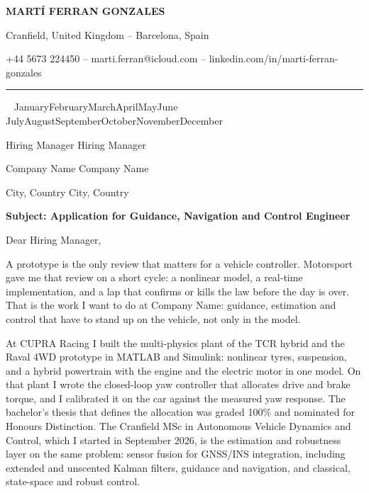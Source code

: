 \documentclass[a4paper,11pt]{article}
\newcommand{\letterdate}{%
  \number\day\ \ifcase\month\or
  January\or February\or March\or April\or May\or June\or
  July\or August\or September\or October\or November\or December\fi
  \ \number\year}
\newcommand{\recipientname}{Hiring Manager}
\newcommand{\recipientrole}{Talent Acquisition}
\newcommand{\company}{Company Name}
\newcommand{\companycity}{City, Country}
\newcommand{\rolename}{Guidance, Navigation and Control Engineer}
\newcommand{\letterline}[1]{%
  \edef\letterlinetmp{#1}%
  \ifx\letterlinetmp\empty\else
    \letterlinetmp\par
  \fi
}
\begin{document}
{\centering
\textbf{\Huge MARTÍ FERRAN GONZALES}\par
\vspace{1pt}
{\fontsize{10}{12}\selectfont
Cranfield, United Kingdom -- Barcelona, Spain\par
\vspace{1pt}
+44 5673 224450 -- marti.ferran@icloud.com -- linkedin.com/in/marti-ferran-gonzales\par
}
\vspace{4pt}
}
\nointerlineskip
\rule{\textwidth}{0.4pt}\par
\vspace{10pt}
\nointerlineskip

\letterdate\par
\vspace{18pt}
\nointerlineskip
\letterline{\recipientname}
\letterline{\company}
\letterline{\companycity}
\vspace{10pt}
\nointerlineskip
\textbf{Subject: Application for \rolename}\par
\vspace{10pt}
\nointerlineskip
Dear \recipientname,\par
\setlength{\parskip}{8pt}

A prototype is the only review that matters for a vehicle controller. Motorsport gave me that review on a short cycle: a nonlinear model, a real-time implementation, and a lap that confirms or kills the law before the day is over. That is the work I want to do at \company: guidance, estimation and control that have to stand up on the vehicle, not only in the model.

At CUPRA Racing I built the multi-physics plant of the TCR hybrid and the Raval 4WD prototype in MATLAB and Simulink: nonlinear tyres, suspension, and a hybrid powertrain with the engine and the electric motor in one model. On that plant I wrote the closed-loop yaw controller that allocates drive and brake torque, and I calibrated it on the car against the measured yaw response. The bachelor's thesis that defines the allocation was graded 100\% and nominated for Honours Distinction. The Cranfield MSc in Autonomous Vehicle Dynamics and Control, which I started in September 2026, is the estimation and robustness layer on the same problem: sensor fusion for GNSS/INS integration, including extended and unscented Kalman filters, guidance and navigation, and classical, state-space and robust control.
\end{document}

